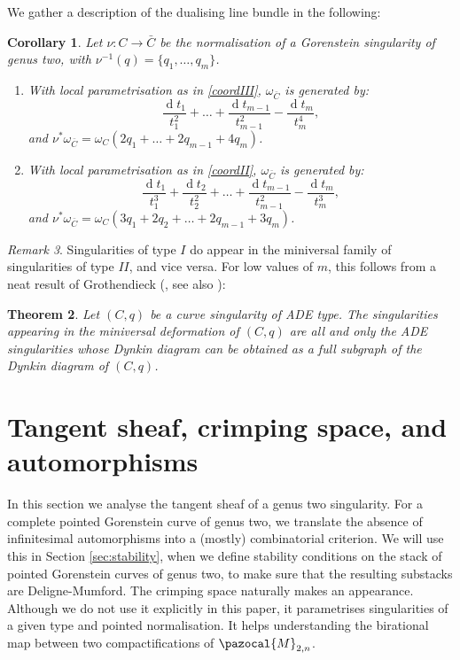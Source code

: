 \documentclass{compositio}
\renewcommand{\to}{\rightarrow}
\theoremstyle{plain}
\newtheorem{thm}{Theorem}[section]
\newtheorem{cor}[thm]{Corollary}
\theoremstyle{definition}
\theoremstyle{remark}
\newtheorem{rem}[thm]{Remark}
\begin{document}
We gather a description of the dualising line bundle in the following:
\begin{cor}\label{cor:dualising_line_bundle}
 Let $\nu\colon C\to \bar C$ be the normalisation of a Gorenstein singularity of genus two, with $\nu^{-1}(q)=\{q_1,\ldots,q_m\}$.
 \begin{enumerate}[label=(\Roman*)]
 
 \item With local parametrisation as in \eqref{coordIII}, $\omega_{\bar C}$ is generated by: \[\frac{\operatorname{d}t_1}{t_1^2}+\ldots+\frac{\operatorname{d}t_{m-1}}{t_{m-1}^2}-\frac{\operatorname{d}t_m}{t_m^4},\]
 and $\nu^*\omega_{\bar C}=\omega_C(2q_1+\ldots+2q_{m-1}+4q_m)$.

 \item With local parametrisation as in \eqref{coordII}, $\omega_{\bar C}$ is generated by:
  \[\frac{\operatorname{d}t_1}{t_1^3}+\frac{\operatorname{d}t_2}{t_2^2}+\ldots+\frac{\operatorname{d}t_{m-1}}{t_{m-1}^2}-\frac{\operatorname{d}t_m}{t_m^3},\]  
  and $\nu^*\omega_{\bar C}=\omega_C(3q_1+2q_2+\ldots+2q_{m-1}+3q_m)$.
                                                                                                                                  \end{enumerate}
\end{cor}

\begin{rem}
 Singularities of type $I$ do appear in the miniversal family of singularities of type $I\!I$, and vice versa. For low values of $m$, this follows from a neat result of Grothendieck (\cite[p. 2277]{C-ML}, see also \cite{Arnold,Demazure}):
 \begin{thm}\label{thm:ADE}
  Let $(C,q)$ be a curve singularity of ADE type. The singularities appearing in the miniversal deformation of $(C,q)$ are all and only the ADE singularities whose Dynkin diagram can be obtained as a full subgraph of the Dynkin diagram of $(C,q)$.
 \end{thm}
\end{rem}


\section{Tangent sheaf, crimping space, and automorphisms}\label{sec:crimp}
In this section we analyse the tangent sheaf of a genus two singularity. For a complete pointed Gorenstein curve of genus two, we translate the absence of infinitesimal automorphisms into a (mostly) combinatorial criterion. We will use this in Section \ref{sec:stability}, when we define stability conditions on the stack of pointed Gorenstein curves of genus two, to make sure that the resulting substacks are Deligne-Mumford. The crimping space naturally makes an appearance. Although we do not use it explicitly in this paper, it parametrises singularities of a given type and pointed normalisation. It helps understanding the birational map between two compactifications of $\pazocal{M}_{2,n}$.
\end{document}
